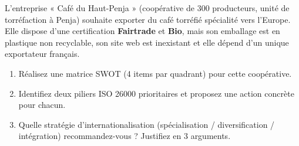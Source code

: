 \documentclass[11pt]{article}
\begin{document}
\begin{exercice}
L'entreprise « Café du Haut-Penja » (coopérative de 300 producteurs, unité de torréfaction à Penja) souhaite exporter du café torréfié spécialité vers l'Europe. Elle dispose d'une certification \textbf{Fairtrade} et \textbf{Bio}, mais son emballage est en plastique non recyclable, son site web est inexistant et elle dépend d'un unique exportateur français.
\begin{enumerate}
    \item Réalisez une matrice SWOT (4 items par quadrant) pour cette coopérative.
    \item Identifiez deux piliers ISO 26000 prioritaires et proposez une action concrète pour chacun.
    \item Quelle stratégie d'internationalisation (spécialisation / diversification / intégration) recommandez-vous ? Justifiez en 3 arguments.
\end{enumerate}
\end{exercice}
\end{document}

